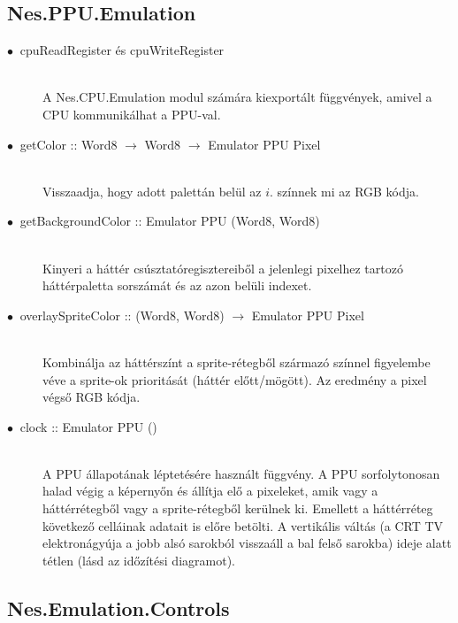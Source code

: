 \subsection{Nes.PPU.Emulation}

\begin{description}
	\item[$\bullet\:$ cpuReadRegister és cpuWriteRegister] \hfill \\
	A Nes.CPU.Emulation modul számára kiexportált függvények, amivel a CPU kommunikálhat a PPU-val.
	\item[$\bullet\:$ getColor :: Word8 $\rightarrow$ Word8 $\rightarrow$ Emulator PPU Pixel] \hfill \\
	Visszaadja, hogy adott palettán belül az $i.$ színnek mi az RGB kódja.
	\item[$\bullet\:$ getBackgroundColor :: Emulator PPU (Word8, Word8)] \hfill \\
	Kinyeri a háttér csúsztatóregisztereiből a jelenlegi pixelhez tartozó háttérpaletta sorszámát és az azon belüli indexet.  
	\item[$\bullet\:$ overlaySpriteColor :: (Word8, Word8) $\rightarrow$ Emulator PPU Pixel] \hfill \\
	Kombinálja az háttérszínt a sprite-rétegből származó színnel figyelembe véve a sprite-ok prioritását (háttér előtt/mögött). Az eredmény a pixel végső RGB kódja.
	\item[$\bullet\:$ clock :: Emulator PPU ()] \hfill \\
	A PPU állapotának léptetésére használt függvény. A PPU sorfolytonosan halad végig a képernyőn és állítja elő a pixeleket, amik vagy a háttérrétegből vagy a sprite-rétegből kerülnek ki. Emellett a háttérréteg következő celláinak adatait is előre  betölti.
	A vertikális váltás (a CRT TV elektronágyúja a jobb alsó sarokból visszaáll a bal felső sarokba) ideje alatt tétlen (lásd az időzítési diagramot).
\end{description}

\subsection{Nes.Emulation.Controls}

